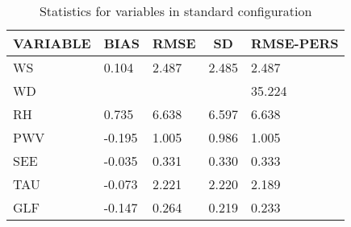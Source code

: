 \begin{table}[]
\begin{center}
\begin{tabular}{|l|l|l|l|l|}
\hline
\multicolumn{1}{c|}{\cellcolor[HTML]{C0C0C0}\textbf{VARIABLE}} & \multicolumn{1}{c|}{\cellcolor[HTML]{C0C0C0}\textbf{BIAS}} & \multicolumn{1}{c|}{\cellcolor[HTML]{C0C0C0}\textbf{RMSE}} & \multicolumn{1}{c|}{\cellcolor[HTML]{C0C0C0}\textbf{SD}} & \multicolumn{1}{c|}{\cellcolor[HTML]{C0C0C0}\textbf{RMSE-PERS}}\\\hline
\cellcolor[HTML]{C0C0C0}WS  &     0.104                                &     2.487                                &     2.485  &     2.487 \\
\cellcolor[HTML]{C0C0C0}WD  &                                 &                                 &   &    35.224 \\
\cellcolor[HTML]{C0C0C0}RH  &     0.735                                &     6.638                                &     6.597  &     6.638 \\
\cellcolor[HTML]{C0C0C0}PWV &    -0.195                               &     1.005                               &     0.986 &     1.005 \\
\cellcolor[HTML]{C0C0C0}SEE &    -0.035                               &     0.331                               &     0.330 &     0.333 \\
\cellcolor[HTML]{C0C0C0}TAU &    -0.073                               &     2.221                               &     2.220 &     2.189 \\
\cellcolor[HTML]{C0C0C0}GLF &    -0.147                               &     0.264                               &     0.219 &     0.233 \\
\hline
\end{tabular}
\caption{Statistics for variables in standard configuration}
\end{center}
\end{table}
